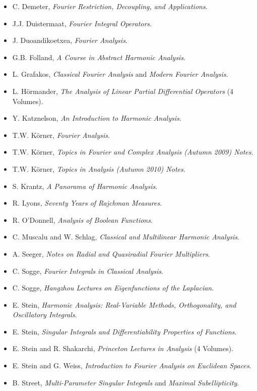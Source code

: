 \begin{itemize}
	\item C. Demeter, \emph{Fourier Restriction, Decoupling, and Applications}.
	\item J.J. Duistermaat, \emph{Fourier Integral Operators}.
	\item J. Duoandikoetxea, \emph{Fourier Analysis}.
	\item G.B. Folland, \emph{A Course in Abstract Harmonic Analysis}.
	\item L. Grafakos, \emph{Classical Fourier Analysis} and \emph{Modern Fourier Analysis}.
	\item L. H\"{o}rmander, \emph{The Analysis of Linear Partial Differential Operators} (4 Volumes).
	\item Y. Katznelson, \emph{An Introduction to Harmonic Analysis}.
	\item T.W. K\"{o}rner, \emph{Fourier Analysis}.
	\item T.W. K\"{o}rner, \emph{Topics in Fourier and Complex Analysis (Autumn 2009) Notes}.
	\item T.W. K\"{o}rner, \emph{Topics in Analysis (Autumn 2010) Notes}.
	\item S. Krantz, \emph{A Panorama of Harmonic Analysis}.
	\item R. Lyons, \emph{Seventy Years of Rajchman Measures}.
	\item R. O'Donnell, \emph{Analysis of Boolean Functions}.
	\item C. Muscalu and W. Schlag, \emph{Classical and Multilinear Harmonic Analysis}.
	\item A. Seeger, \emph{Notes on Radial and Quasiradial Fourier Multipliers}.
	\item C. Sogge, \emph{Fourier Integrals in Classical Analysis}.
	\item C. Sogge, \emph{Hangzhou Lectures on Eigenfunctions of the Laplacian}.
	\item E. Stein, \emph{Harmonic Analysis: Real-Variable Methods, Orthogonality, and Oscillatory Integrals}.
	\item E. Stein, \emph{Singular Integrals and Differentiability Properties of Functions}.
	\item E. Stein and R. Shakarchi, \emph{Princeton Lectures in Analysis} (4 Volumes).
	\item E. Stein and G. Weiss, \emph{Introduction to Fourier Analysis on Euclidean Spaces}.
	\item B. Street, \emph{Multi-Parameter Singular Integrals} and \emph{Maximal Subellipticity}.

\end{itemize}
